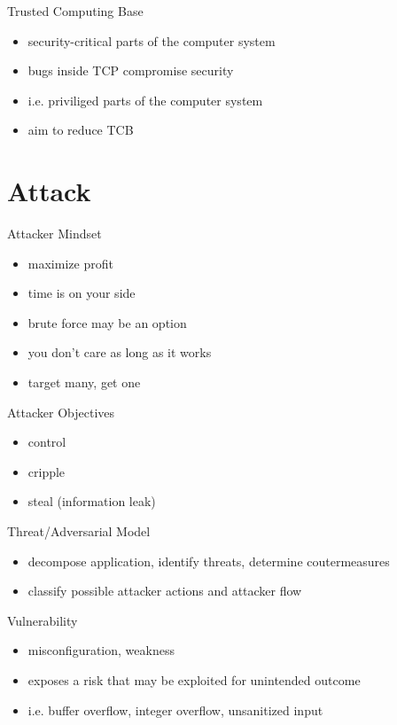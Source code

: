 \documentclass{curs}
\begin{document}
\begin{frame}{Trusted Computing Base}
  \begin{itemize}
    \item security-critical parts of the computer system
    \item bugs inside TCP compromise security
    \item i.e. priviliged parts of the computer system
    \item aim to reduce TCB
  \end{itemize}
\end{frame}


\section{Attack}

\begin{frame}{Attacker Mindset}
  \begin{itemize}
    \item maximize profit
    \item time is on your side
    \item brute force may be an option
    \item you don't care as long as it works
    \item target many, get one
  \end{itemize}
\end{frame}

\begin{frame}{Attacker Objectives}
  \begin{itemize}
    \item control
    \item cripple
    \item steal (information leak)
  \end{itemize}
\end{frame}

\begin{frame}{Threat/Adversarial Model}
  \begin{itemize}
    \item decompose application, identify threats, determine coutermeasures
    \item classify possible attacker actions and attacker flow
  \end{itemize}
\end{frame}

\begin{frame}{Vulnerability}
  \begin{itemize}
    \item misconfiguration, weakness
    \item exposes a risk that may be exploited for unintended outcome
    \item i.e. buffer overflow, integer overflow, unsanitized input
  \end{itemize}
\end{frame}
\end{document}
